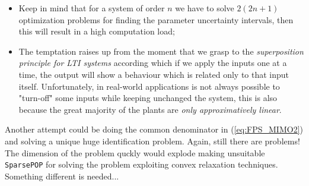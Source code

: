 \begin{itemize}
    \item Keep in mind that for a system of order $n$ we have to solve $2(2n+1)$ optimization problems for finding the parameter uncertainty intervals, then this will result in a high computation load; 
    \item The temptation raises up from the moment that we grasp to the \textit{superposition principle for LTI systems} according which if we apply the inputs one at a time, the output will show a behaviour which is related only to that input itself. Unfortunately, in real-world applications is not always possible to "turn-off" some inputs while keeping unchanged the system, this is also because the great majority of the plants are \textit{only approximatively linear}.
\end{itemize}

Another attempt could be doing the common denominator in  (\ref{eq:FPS_MIMO2}) and solving a unique huge identification problem. Again, still there are problems! The dimension of the problem quckly would explode making unsuitable \texttt{SparsePOP} for solving the problem exploiting convex relaxation techniques. Something different is needed... 
